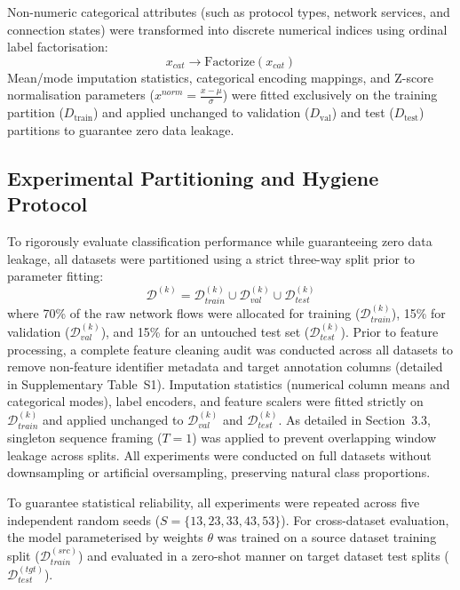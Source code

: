 \documentclass[a4paper,fleqn]{cas-sc}
\begin{document}
Non-numeric categorical attributes (such as protocol types, network services, and connection states) were transformed into discrete numerical indices using ordinal label factorisation:
\begin{equation}
x_{cat} \rightarrow \text{Factorize}(x_{cat})
\end{equation}
Mean/mode imputation statistics, categorical encoding mappings, and Z-score normalisation parameters ($x^{norm} = \frac{x - \mu}{\sigma}$) were fitted exclusively on the training partition ($D_{\text{train}}$) and applied unchanged to validation ($D_{\text{val}}$) and test ($D_{\text{test}}$) partitions to guarantee zero data leakage.

\subsection{Experimental Partitioning and Hygiene Protocol}

To rigorously evaluate classification performance while guaranteeing zero data leakage, all datasets were partitioned using a strict three-way split prior to parameter fitting:
\begin{equation}
\mathcal{D}^{(k)} = \mathcal{D}^{(k)}_{train} \cup \mathcal{D}^{(k)}_{val} \cup \mathcal{D}^{(k)}_{test}
\end{equation}
where 70\% of the raw network flows were allocated for training ($\mathcal{D}^{(k)}_{train}$), 15\% for validation ($\mathcal{D}^{(k)}_{val}$), and 15\% for an untouched test set ($\mathcal{D}^{(k)}_{test}$). Prior to feature processing, a complete feature cleaning audit was conducted across all datasets to remove non-feature identifier metadata and target annotation columns (detailed in Supplementary Table~S1). Imputation statistics (numerical column means and categorical modes), label encoders, and feature scalers were fitted strictly on $\mathcal{D}^{(k)}_{train}$ and applied unchanged to $\mathcal{D}^{(k)}_{val}$ and $\mathcal{D}^{(k)}_{test}$. As detailed in Section~3.3, singleton sequence framing ($T = 1$) was applied to prevent overlapping window leakage across splits. All experiments were conducted on full datasets without downsampling or artificial oversampling, preserving natural class proportions.

To guarantee statistical reliability, all experiments were repeated across five independent random seeds ($S = \{13, 23, 33, 43, 53\}$). For cross-dataset evaluation, the model parameterised by weights $\theta$ was trained on a source dataset training split ($\mathcal{D}^{(src)}_{train}$) and evaluated in a zero-shot manner on target dataset test splits ($\mathcal{D}^{(tgt)}_{test}$).
\end{document}
